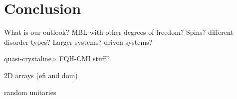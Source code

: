 

\chapter{Conclusion}
\label{conclusion}

What is our outlook? MBL with other degrees of freedom? Spins? different disorder types? Larger systems? driven systems? 

quasi-crystaline> FQH-CMI stuff?

2D arrays (efi and dom)

random unitaries